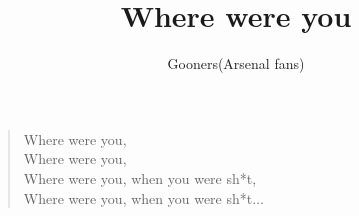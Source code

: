 \documentclass[a4paper,12pt]{article}
\title{Where were you}
\author{Gooners(Arsenal fans)}
\date{}
\begin{document}
	
	\maketitle
	
	\begin{verse}
		
		Where were you, \\
		Where were you, \\
		Where were you, when you were sh*t, \\
		Where were you, when you were sh*t$\ldots$
		
	\end{verse}
	
\end{document}
